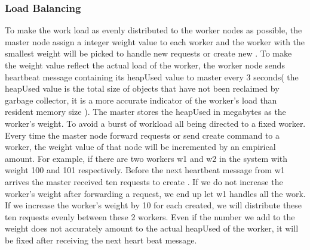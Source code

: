 \requestdispatchdiagram{}

\subsubsection{Load Balancing}
\label{sec:lb}
To make the work load as evenly distributed to the worker nodes as possible,
the master node assign a integer weight value to each worker
and the worker with the smallest weight will be picked to handle new requests
or create new \appins{}.
To make the weight value reflect the actual load of the worker,
the worker node sends heartbeat message containing 
its heapUsed value to master every 3 seconds(
the heapUsed value is the total size of \js{} objects that have not been
reclaimed by garbage collector, 
it is a more accurate indicator of the worker's load than resident memory size
).
The master stores the heapUsed in megabytes as the worker's weight.
To avoid a burst of workload all being directed to a fixed worker.
Every time the master node forward requests or send create \appins{} command to a worker,
the weight value of that node will be incremented by an empirical amount.
For example, if there are two workers w1 and w2 in the system with weight
100 and 101 respectively.
Before the next heartbeat message from w1 arrives the master received ten requests to 
create \appins{}.
If we do not increase the worker's weight after forwarding a request,
we end up let w1 handles all the work.
If we increase the worker's weight by 10 for each \appins{} created,
we will distribute these ten requests evenly between these 2 workers.
Even if the number we add to the weight does not accurately amount to the actual 
heapUsed of the worker, it will be fixed after receiving the next heart beat message.


